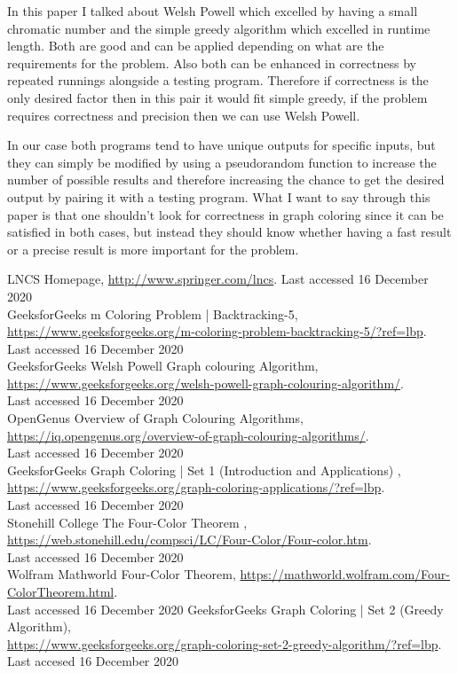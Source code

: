 \documentclass[runningheads]{llncs}
\begin{document}
In this paper I talked about Welsh Powell which excelled by having a small chromatic number and the simple greedy algorithm which
excelled in runtime length. Both are good and can be applied depending on what are the requirements for the
problem. Also both can be enhanced in correctness by repeated runnings alongside a testing program. Therefore if
correctness is the only desired factor then in this pair it would fit simple greedy, if the problem requires correctness
and precision then we can use Welsh Powell.

In our case both programs tend to have unique outputs for specific inputs, but they can simply be modified by
using a pseudorandom function to increase the number of possible results and therefore increasing the chance to get
the desired output by pairing it with a testing program. What I want to say through this paper is that one shouldn't look
for correctness in graph coloring since it can be satisfied in both cases, but instead they should know whether having
a fast result or a precise result is more important for the problem.
\begin{thebibliography}{8}
LNCS Homepage, \url{http://www.springer.com/lncs}. 
Last accessed 16 December 2020\\
GeeksforGeeks m Coloring Problem | Backtracking-5,\\
\url{https://www.geeksforgeeks.org/m-coloring-problem-backtracking-5/?ref=lbp}. \\
Last accessed 16 December 2020\\
GeeksforGeeks Welsh Powell Graph colouring Algorithm, \\
\url{https://www.geeksforgeeks.org/welsh-powell-graph-colouring-algorithm/}. \\
Last accessed 16 December 2020\\
OpenGenus Overview of Graph Colouring Algorithms, \\
\url{https://iq.opengenus.org/overview-of-graph-colouring-algorithms/}.\\
Last accessed 16 December 2020\\
GeeksforGeeks Graph Coloring | Set 1 (Introduction and Applications) , \\
\url{https://www.geeksforgeeks.org/graph-coloring-applications/?ref=lbp}.\\
Last accessed 16 December 2020\\
Stonehill College The Four-Color Theorem , \\
\url{https://web.stonehill.edu/compsci/LC/Four-Color/Four-color.htm}.\\ 
Last accessed 16 December 2020\\
Wolfram Mathworld Four-Color Theorem, \url{https://mathworld.wolfram.com/Four-ColorTheorem.html}.\\
Last accessed 16 December 2020
GeeksforGeeks Graph Coloring | Set 2 (Greedy Algorithm), \\
\url{https://www.geeksforgeeks.org/graph-coloring-set-2-greedy-algorithm/?ref=lbp}.\\
Last accesed 16 December 2020
\end{thebibliography}
\end{document}
